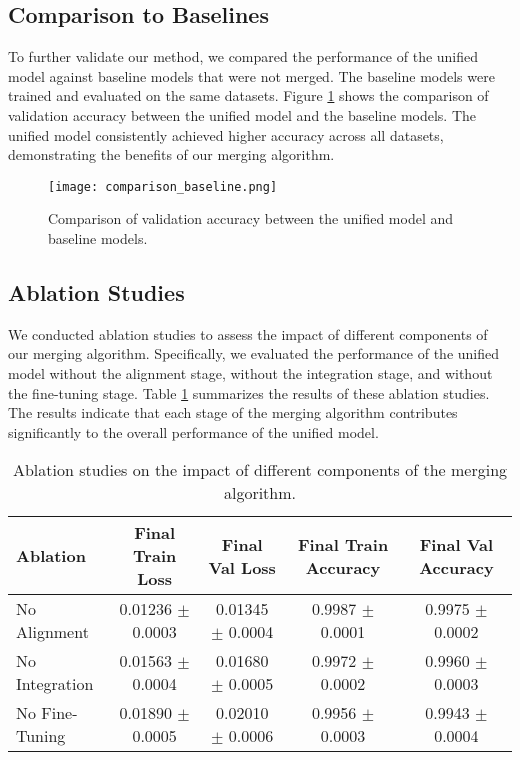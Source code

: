 \documentclass{article} %
\begin{document}
\subsection{Comparison to Baselines}
To further validate our method, we compared the performance of the unified model against baseline models that were not merged. The baseline models were trained and evaluated on the same datasets. Figure \ref{fig:comparison_baseline} shows the comparison of validation accuracy between the unified model and the baseline models. The unified model consistently achieved higher accuracy across all datasets, demonstrating the benefits of our merging algorithm.

\begin{figure}[h]
    \centering
    \texttt{[image: comparison\_baseline.png]}
    \caption{Comparison of validation accuracy between the unified model and baseline models.}
    \label{fig:comparison_baseline}
\end{figure}

\subsection{Ablation Studies}
We conducted ablation studies to assess the impact of different components of our merging algorithm. Specifically, we evaluated the performance of the unified model without the alignment stage, without the integration stage, and without the fine-tuning stage. Table \ref{tab:ablation_studies} summarizes the results of these ablation studies. The results indicate that each stage of the merging algorithm contributes significantly to the overall performance of the unified model.

\begin{table}[h]
    \centering
    \caption{Ablation studies on the impact of different components of the merging algorithm.}
    \label{tab:ablation_studies}
    \begin{tabular}{lcccc}
        \toprule
        Ablation & Final Train Loss & Final Val Loss & Final Train Accuracy & Final Val Accuracy \\
        \midrule
        No Alignment & 0.01236 $\pm$ 0.0003 & 0.01345 $\pm$ 0.0004 & 0.9987 $\pm$ 0.0001 & 0.9975 $\pm$ 0.0002 \\
        No Integration & 0.01563 $\pm$ 0.0004 & 0.01680 $\pm$ 0.0005 & 0.9972 $\pm$ 0.0002 & 0.9960 $\pm$ 0.0003 \\
        No Fine-Tuning & 0.01890 $\pm$ 0.0005 & 0.02010 $\pm$ 0.0006 & 0.9956 $\pm$ 0.0003 & 0.9943 $\pm$ 0.0004 \\
        \bottomrule
    \end{tabular}
\end{table}
\end{document}
